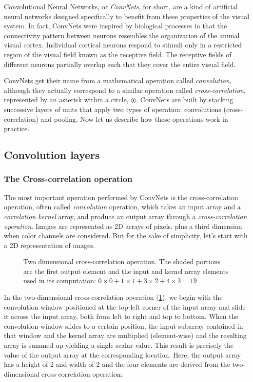 Convolutional Neural Networks, or \textit{ConvNets}, for short, are a kind of artificial neural networks designed specifically to benefit  from these properties of the visual system. In fact, ConvNets were inspired by biological processes in that the connectivity pattern between neurons resembles the organization of the animal visual cortex. Individual cortical neurons respond to stimuli only in a restricted region of the visual field known as the receptive field. The receptive fields of different neurons partially overlap such that they cover the entire visual field.

ConvNets get their name from a mathematical operation called \textit{convolution}, although they actually correspond to a similar operation called \textit{cross-correlation}, represented by an asterisk within a circle, $\circledast$. ConvNets are built by stacking successive layers of units that apply two types of operation: convolutions (cross-correlation) and pooling. Now let us describe how these operations work in practice.

\subsection{Convolution layers}\label{subsec:conv_layers}

\subsubsection{The Cross-correlation operation}

The most important operation performed by ConvNets is the cross-correlation operation, often called \textit{convolution} operation, which takes an input array and a \textit{correlation kernel} array, and produce an output array through a \textit{cross-correlation operation}. Images are represented as 2D arrays of pixels, plus a third dimension when color channels are considered. But for the sake of simplicity, let's start with a 2D representation of images. 

\begin{figure}[hpt]
	\centering
	
	\caption{Two dimensional cross-correlation operation. The shaded portions are the first output element and the input and kernel array elements used in its computation: $0 \times 0+1 \times 1+3 \times 2+4 \times 3=19$}
	\label{fig:correlation}
\end{figure}

In the two-dimensional cross-correlation operation (\cref{fig:correlation}), we begin with the convolution window positioned at the top-left corner of the input array and slide it across the input array, both from left to right and top to bottom. When the convolution window slides to a certain position, the input subarray contained in that window and the kernel array are multiplied (element-wise) and the resulting array is summed up yielding a single scalar value. This result is precisely the value of the output array at the corresponding location. Here, the output array has a height of 2 and width of 2 and the four elements are derived from the two-dimensional cross-correlation operation:

